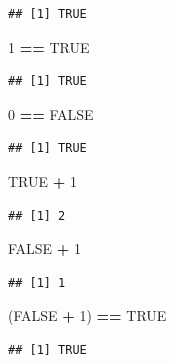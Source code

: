 \documentclass[
]{book}
\newenvironment{Shaded}{\begin{snugshade}}{\end{snugshade}}
\newcommand{\DecValTok}[1]{\textcolor[rgb]{0.00,0.00,0.81}{#1}}
\newcommand{\NormalTok}[1]{#1}
\newcommand{\OperatorTok}[1]{\textcolor[rgb]{0.81,0.36,0.00}{\textbf{#1}}}
\newcommand{\OtherTok}[1]{\textcolor[rgb]{0.56,0.35,0.01}{#1}}
\newcommand{\StringTok}[1]{\textcolor[rgb]{0.31,0.60,0.02}{#1}}
\begin{document}
\begin{verbatim}
## [1] TRUE
\end{verbatim}

\begin{Shaded}
\begin{Highlighting}[]
\DecValTok{1} \OperatorTok{==}\StringTok{ }\OtherTok{TRUE}
\end{Highlighting}
\end{Shaded}

\begin{verbatim}
## [1] TRUE
\end{verbatim}

\begin{Shaded}
\begin{Highlighting}[]
\DecValTok{0} \OperatorTok{==}\StringTok{ }\OtherTok{FALSE}
\end{Highlighting}
\end{Shaded}

\begin{verbatim}
## [1] TRUE
\end{verbatim}

\begin{Shaded}
\begin{Highlighting}[]
\OtherTok{TRUE} \OperatorTok{+}\StringTok{ }\DecValTok{1}
\end{Highlighting}
\end{Shaded}

\begin{verbatim}
## [1] 2
\end{verbatim}

\begin{Shaded}
\begin{Highlighting}[]
\OtherTok{FALSE} \OperatorTok{+}\StringTok{ }\DecValTok{1}
\end{Highlighting}
\end{Shaded}

\begin{verbatim}
## [1] 1
\end{verbatim}

\begin{Shaded}
\begin{Highlighting}[]
\NormalTok{(}\OtherTok{FALSE} \OperatorTok{+}\StringTok{ }\DecValTok{1}\NormalTok{) }\OperatorTok{==}\StringTok{ }\OtherTok{TRUE}
\end{Highlighting}
\end{Shaded}

\begin{verbatim}
## [1] TRUE
\end{verbatim}
\end{document}
